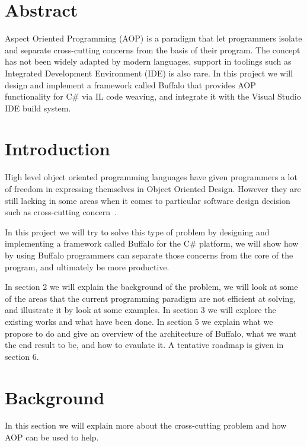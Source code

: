 \section*{Abstract}
Aspect Oriented Programming (AOP) is a paradigm that let programmers isolate and separate cross-cutting concerns from the basis of their program. The concept has not been widely adapted by modern languages, support in toolings such as Integrated Development Environment (IDE) is also rare. In this project we will design and implement a framework called Buffalo that provides AOP functionality for C\# via IL code weaving, and integrate it with the Visual Studio IDE build system.
\vfill{}

\setcounter{page}{0} 
\newpage{}
\section{Introduction}
High level object oriented programming languages have given programmers a lot of freedom in expressing themselves in Object Oriented Design. However they are still lacking in some areas when it comes to particular software design decision such as cross-cutting concern~\cite{aop}. 

In this project we will try to solve this type of problem by designing and implementing a framework called Buffalo for the C\# platform, we will show how by using Buffalo programmers can separate those concerns from the core of the program, and ultimately be more productive.

In section 2 we will explain the background of the problem, we will look at some of the areas that the current programming paradigm are not efficient at solving, and illustrate it by look at some examples. In section 3 we will explore the existing works and what have been done. In section 5 we explain what we propose to do and give an overview of the architecture of Buffalo, what we want the end result to be, and how to evaulate it. A tentative roadmap is given in section 6.

\section{Background}
In this section we will explain more about the cross-cutting problem and how AOP can be used to help.

